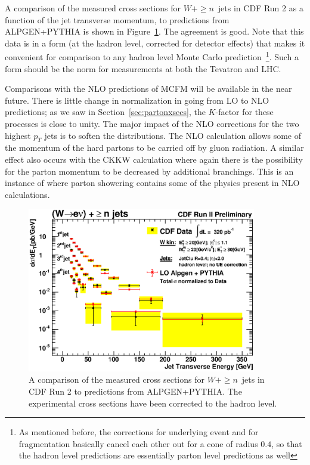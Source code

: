\documentclass[12pt]{iopart}
\begin{document}
A comparison of the measured cross sections for $W + \ge n$~jets in CDF Run 2 as a function of the jet transverse momentum, to predictions
from ALPGEN+PYTHIA is shown in Figure~\ref{fig:tev_w_mcfm}. The agreement is good. Note that this data is in a form (at the hadron level,
corrected for detector effects) that  makes it convenient for comparison to any hadron level Monte  Carlo
prediction~\footnote{
As mentioned before,  the corrections for underlying event and for fragmentation basically cancel each other out
for a cone of radius $0.4$, so that the hadron level predictions are essentially parton level predictions as well}.
Such a form should be the norm for measurements at both the Tevatron and LHC. 

Comparisons with the NLO predictions of MCFM will be available in the near future. There is little change in normalization in going from LO
to NLO predictions; as we saw in Section~\ref{sec:partonxsecs}, the $K$-factor for these processes is close to
unity. The major impact of the NLO corrections for the two highest
$p_T$ jets is to soften the distributions.
The NLO calculation allows some of the momentum of the hard  partons to be carried off by gluon radiation. A similar effect also occurs
with the CKKW  calculation where again there is the possibility for the parton momentum to be decreased by  additional branchings. This
is an instance of where parton showering contains some of the  physics present in NLO calculations.
%
\begin{figure}
\begin{center}
\includegraphics[width=10cm]{allJet_diffXS.eps}
\end{center}
\caption{
A comparison of the measured cross sections for $W + \ge n$~jets in CDF Run 2 to predictions from ALPGEN+PYTHIA. The experimental cross
sections have been corrected to the hadron level.
\label{fig:tev_w_mcfm}}
\end{figure}
%
\end{document}
